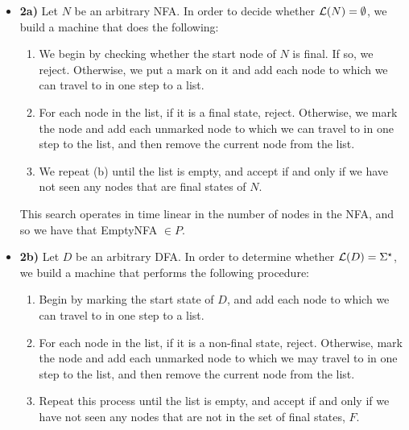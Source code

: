 \documentclass[12pt]{article}
\begin{document}
\begin{enumerate}
\begin{itemize}

\item \textbf{2a)} Let $N$ be an arbitrary NFA. In order to decide whether ${\cal L}(N) = \emptyset$, we build a machine that does the following:

\begin{enumerate}

\item We begin by checking whether the start node of $N$ is final. If so, we reject. Otherwise, we put a mark on it and add each node to which we can travel to in one step to a list. 

\item For each node in the list, if it is a final state, reject. Otherwise, we mark the node and add each unmarked node to which we can travel to in one step to the list, and then remove the current node from the list.

\item We repeat (b) until the list is empty, and accept if and only if we have not seen any nodes that are final states of $N$. 

\end{enumerate}

This search operates in time linear in the number of nodes in the NFA, and so we have that EmptyNFA $\in P$.

\item \textbf{2b)} Let $D$ be an arbitrary DFA. In order to determine whether ${{\cal L}(D) = \Sigma^\star}$, we build a machine that performs the following procedure:

\begin{enumerate} 

\item Begin by marking the start state of $D$, and add each node to which we can travel to in one step to a list.

\item For each node in the list, if it is a non-final state, reject. Otherwise, mark the node and add each unmarked node to which we may travel to in one step to the list, and then remove the current node from the list.  

\item Repeat this process until the list is empty, and accept if and only if we have not seen any nodes that are not in the set of final states, $F$.

\end{enumerate}


\end{itemize}
\end{enumerate}
\end{document}

